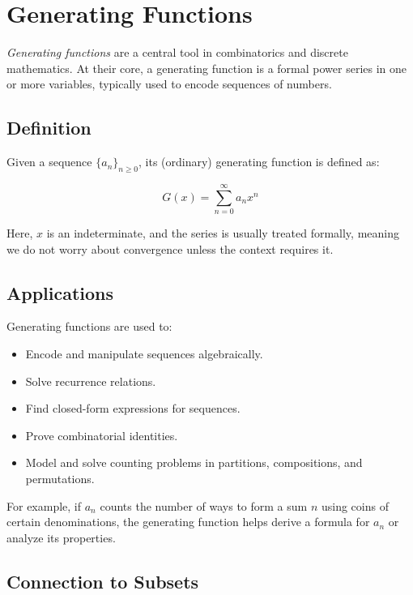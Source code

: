 \newpage
\section{Generating Functions}

\emph{Generating functions} are a central tool in combinatorics and discrete mathematics. At their 
core, a generating function is a formal power series in one or more variables, 
typically used to encode sequences of numbers.

\subsection{Definition}

Given a sequence \( {\{a_n\}}_{n \ge 0} \), its (ordinary) generating function is defined as:

\[
    G(x) = \sum_{n=0}^{\infty} a_n x^n
\]

Here, \( x \) is an indeterminate, and the series is usually treated formally, meaning we do not 
worry about convergence unless the context requires it.

\subsection{Applications}

Generating functions are used to:

\begin{itemize}

    \item Encode and manipulate sequences algebraically.

    \item Solve recurrence relations.

    \item Find closed-form expressions for sequences.

    \item Prove combinatorial identities.

    \item Model and solve counting problems in partitions, compositions, and permutations.

\end{itemize}

For example, if \( a_n \) counts the number of ways to form a sum \( n \) using coins of certain 
denominations, the generating function helps derive a formula for \( a_n \) or analyze its properties.

\subsection{Connection to Subsets}

